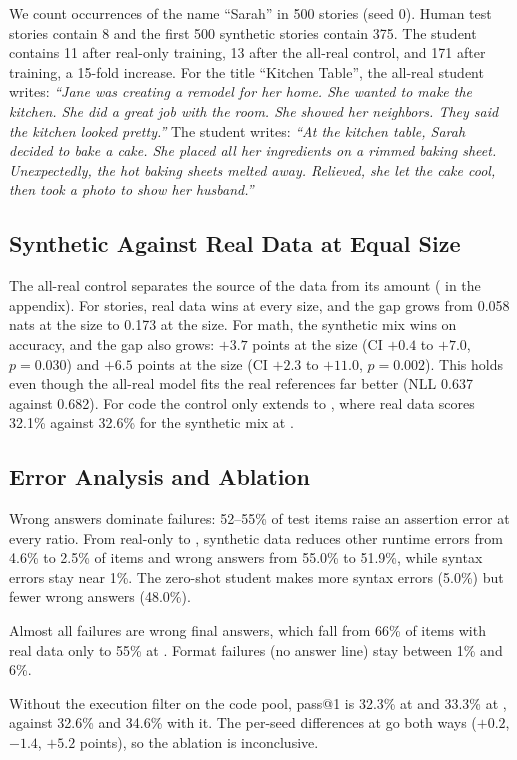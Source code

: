  We count occurrences of the name ``Sarah'' in 500 stories (seed 0).
Human test stories contain 8 and the first 500 synthetic stories contain 375.
The student contains 11 after real-only training, 13 after the all-real control, and 171 after  training, a 15-fold increase.
For the title ``Kitchen Table'', the all-real student writes: \emph{``Jane was creating a remodel for her home. She wanted to make the kitchen. She did a great job with the room. She showed her neighbors. They said the kitchen looked pretty.''}
The  student writes: \emph{``At the kitchen table, Sarah decided to bake a cake. She placed all her ingredients on a rimmed baking sheet. Unexpectedly, the hot baking sheets melted away. Relieved, she let the cake cool, then took a photo to show her husband.''}

\subsection{Synthetic Against Real Data at Equal Size}
\label{sec:synth_vs_real}

The all-real control separates the source of the data from its amount ( in the appendix).
For stories, real data wins at every size, and the gap grows from 0.058 nats at the  size to 0.173 at the  size.
For math, the synthetic mix wins on accuracy, and the gap also grows: $+3.7$ points at the  size (CI $+0.4$ to $+7.0$, $p = 0.030$) and $+6.5$ points at the  size (CI $+2.3$ to $+11.0$, $p = 0.002$).
This holds even though the all-real model fits the real references far better (NLL 0.637 against 0.682).
For code the control only extends to , where real data scores 32.1\% against 32.6\% for the synthetic mix at .

\subsection{Error Analysis and Ablation}
\label{sec:errors}

 Wrong answers dominate failures: 52--55\% of test items raise an assertion error at every ratio. From real-only to , synthetic data reduces other runtime errors from 4.6\% to 2.5\% of items and wrong answers from 55.0\% to 51.9\%, while syntax errors stay near 1\%. The zero-shot student makes more syntax errors (5.0\%) but fewer wrong answers (48.0\%).

 Almost all failures are wrong final answers, which fall from 66\% of items with real data only to 55\% at . Format failures (no answer line) stay between 1\% and 6\%.

 Without the execution filter on the code pool, pass@1 is 32.3\% at  and 33.3\% at , against 32.6\% and 34.6\% with it. The per-seed differences at  go both ways ($+0.2$, $-1.4$, $+5.2$ points), so the ablation is inconclusive.

